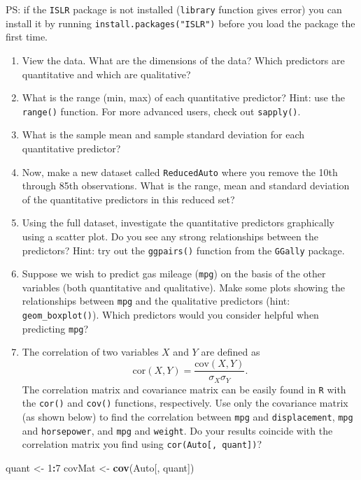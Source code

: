 \documentclass[
]{article}
\newenvironment{Shaded}{\begin{snugshade}}{\end{snugshade}}
\newcommand{\DecValTok}[1]{\textcolor[rgb]{0.00,0.00,0.81}{#1}}
\newcommand{\FunctionTok}[1]{\textcolor[rgb]{0.13,0.29,0.53}{\textbf{#1}}}
\newcommand{\NormalTok}[1]{#1}
\newcommand{\OtherTok}[1]{\textcolor[rgb]{0.56,0.35,0.01}{#1}}
\newcommand{\SpecialCharTok}[1]{\textcolor[rgb]{0.81,0.36,0.00}{\textbf{#1}}}
\begin{document}
PS: if the \texttt{ISLR} package is not installed (\texttt{library}
function gives error) you can install it by running
\texttt{install.packages("ISLR")} before you load the package the first
time.

\begin{enumerate}
\def\labelenumi{\alph{enumi})}
\item
  View the data. What are the dimensions of the data? Which predictors
  are quantitative and which are qualitative?
\item
  What is the range (min, max) of each quantitative predictor? Hint: use
  the \texttt{range()} function. For more advanced users, check out
  \texttt{sapply()}.
\item
  What is the sample mean and sample standard deviation for each
  quantitative predictor?
\item
  Now, make a new dataset called \texttt{ReducedAuto} where you remove
  the 10th through 85th observations. What is the range, mean and
  standard deviation of the quantitative predictors in this reduced set?
\item
  Using the full dataset, investigate the quantitative predictors
  graphically using a scatter plot. Do you see any strong relationships
  between the predictors? Hint: try out the \texttt{ggpairs()} function
  from the \texttt{GGally} package.
\item
  Suppose we wish to predict gas mileage (\texttt{mpg}) on the basis of
  the other variables (both quantitative and qualitative). Make some
  plots showing the relationships between \texttt{mpg} and the
  qualitative predictors (hint: \texttt{geom\_boxplot()}). Which
  predictors would you consider helpful when predicting \texttt{mpg}?
\item
  The correlation of two variables \(X\) and \(Y\) are defined as \[
  \text{cor}(X,Y) = \frac{\text{cov}(X,Y)}{\sigma_X\sigma_Y}.
  \] The correlation matrix and covariance matrix can be easily found in
  \texttt{R} with the \texttt{cor()} and \texttt{cov()} functions,
  respectively. Use only the covariance matrix (as shown below) to find
  the correlation between \texttt{mpg} and \texttt{displacement},
  \texttt{mpg} and \texttt{horsepower}, and \texttt{mpg} and
  \texttt{weight}. Do your results coincide with the correlation matrix
  you find using \texttt{cor(Auto{[},\ quant{]})}?
\end{enumerate}

\begin{Shaded}
\begin{Highlighting}[]
\NormalTok{quant }\OtherTok{\textless{}{-}} \DecValTok{1}\SpecialCharTok{:}\DecValTok{7}
\NormalTok{covMat }\OtherTok{\textless{}{-}} \FunctionTok{cov}\NormalTok{(Auto[, quant])}
\end{Highlighting}
\end{Shaded}
\end{document}
